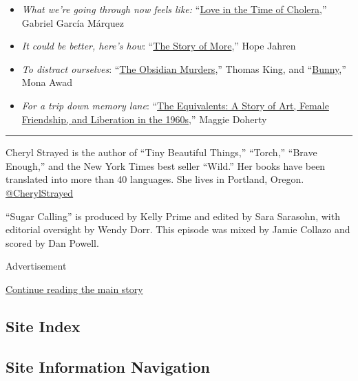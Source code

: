 \begin{itemize}
\item
  \emph{What we're going through now feels like:}
  ``\href{https://www.amazon.com/dp/B00NKDOZNM/ref=dp-kindle-redirect?_encoding=UTF8\&btkr=1}{Love
  in the Time of Cholera},'' Gabriel García Márquez
\item
  \emph{It could be better, here's how}:
  ``\href{https://www.amazon.com/Story-More-Climate-Change-Where/dp/0525563385}{The
  Story of More},'' Hope Jahren
\item
  \emph{To distract ourselves}:
  ``\href{https://www.amazon.com/Obsidian-Murders-DreadfulWater-Mystery/dp/1443457086}{The
  Obsidian Murders},'' Thomas King, and
  ``\href{https://www.amazon.com/Bunny-Novel-Mona-Awad/dp/0525559736}{Bunny},''
  Mona Awad
\item
  \emph{For a trip down memory lane}:
  ``\href{https://www.amazon.com/Equivalents-Story-Female-Friendship-Liberation-ebook/dp/B07SSQ4TWH}{The
  Equivalents: A Story of Art, Female Friendship, and Liberation in the
  1960s},'' Maggie Doherty
\end{itemize}

\begin{center}\rule{0.5\linewidth}{\linethickness}\end{center}

Cheryl Strayed is the author of ``Tiny Beautiful Things,'' ``Torch,''
``Brave Enough,'' and the New York Times best seller ``Wild.'' Her books
have been translated into more than 40 languages. She lives in Portland,
Oregon.
\href{https://twitter.com/CherylStrayed?ref_src=twsrc\%5Egoogle\%7Ctwcamp\%5Eserp\%7Ctwgr\%5Eauthor}{@CherylStrayed}

``Sugar Calling'' is produced by Kelly Prime and edited by Sara
Sarasohn, with editorial oversight by Wendy Dorr. This episode was mixed
by Jamie Collazo and scored by Dan Powell.

Advertisement

\protect\hyperlink{after-bottom}{Continue reading the main story}

\hypertarget{site-index}{%
\subsection{Site Index}\label{site-index}}

\hypertarget{site-information-navigation}{%
\subsection{Site Information
Navigation}\label{site-information-navigation}}

